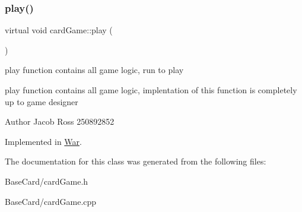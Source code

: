 \subsubsection{\texorpdfstring{play()}{play()}}
{\footnotesize\ttfamily virtual void card\+Game\+::play (\begin{DoxyParamCaption}{ }\end{DoxyParamCaption})\hspace{0.3cm}{\ttfamily [pure virtual]}}



play function contains all game logic, run to play 

play function contains all game logic, implentation of this function is completely up to game designer \begin{DoxyAuthor}{Author}
Jacob Ross 250892852 
\end{DoxyAuthor}


Implemented in \hyperlink{classWar_a507414bb7608a837b7b884827795de81}{War}.



The documentation for this class was generated from the following files\+:\begin{DoxyCompactItemize}
\item 
Base\+Card/card\+Game.\+h\item 
Base\+Card/card\+Game.\+cpp\end{DoxyCompactItemize}

